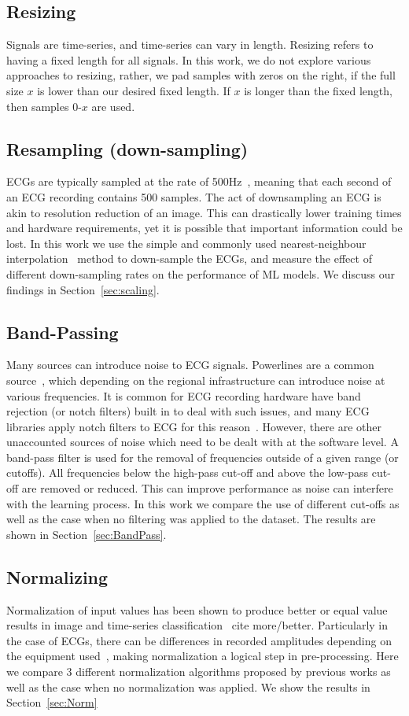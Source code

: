 \documentclass[pmlr,twocolumn]{jmlr}%
\begin{document}
\subsection{Resizing} 
Signals are time-series, and time-series can vary in length. Resizing refers to having a fixed length for all signals. In this work, we do not explore various approaches to resizing, rather, we pad samples with zeros on the right, if the full size $x$ is lower than our desired fixed length. If $x$ is longer than the fixed length, then samples 0-$x$ are used. 
\subsection{Resampling (down-sampling)}
ECGs are typically sampled at the rate of 500Hz~\cite{luo2010review,uwaechia2021comprehensive}, meaning that each second of an ECG recording contains 500 samples. The act of downsampling an ECG is akin to resolution reduction of an image. This can drastically lower training times and hardware requirements, yet it is possible that important information could be lost. In this work we use the simple and commonly used nearest-neighbour interpolation~\cite{rukundo2012nearest} method to down-sample the ECGs, and measure the effect of different down-sampling rates on the performance of ML models. We discuss our findings in Section~\ref{sec:scaling}. 
\subsection{Band-Passing}
Many sources can introduce noise to ECG signals. Powerlines are a common source~\cite{uwaechia2021comprehensive}, which depending on the regional infrastructure can introduce noise at various frequencies. It is common for ECG recording hardware have band rejection (or notch filters) built in to deal with such issues, and many ECG libraries apply notch filters to ECG for this reason~\cite{Makowski2021neurokit}. However, there are other unaccounted sources of noise which need to be dealt with at the software level. A band-pass filter is used for the removal of frequencies outside of a given range (or cutoffs). All frequencies below the high-pass cut-off and above the low-pass cut-off are removed or reduced. This can improve performance as noise can interfere with the learning process. In this work we compare the use of different cut-offs as well as the case when no filtering was applied to the dataset. The results are shown in Section~\ref{sec:BandPass}. 
\subsection{Normalizing}
Normalization of input values has been shown to produce better or equal value results in image and time-series classification~\cite{bhanja2018impact}{\color{red} cite more/better}. Particularly in the case of ECGs, there can be differences in recorded amplitudes depending on the equipment used~\cite{uwaechia2021comprehensive}, making normalization a logical step in pre-processing. Here we compare 3 different normalization algorithms proposed by previous works as well as the case when no normalization was applied. We show the results in Section~\ref{sec:Norm}
\end{document}
